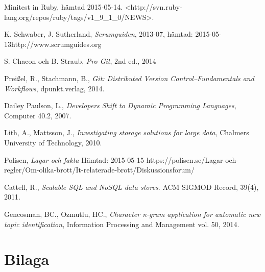 \documentclass[a4paper,12pt,oneside,final]{extbook}
\begin{document}
\begin{thebibliography}{99}
  Minitest in Ruby, hämtad 2015-05-14.
  \newline<http://svn.ruby-lang.org/repos/ruby/tags/v1\_9\_1\_0/NEWS>.

  K. Schwaber, J. Sutherland, \emph{Scrumguiden}, 2013-07, hämtad: 2015-05-13\newline http://www.scrumguides.org

  S. Chacon och B. Straub, \emph{Pro Git}, 2nd ed., 2014

  Preißel, R., Stachmann, B., \emph{Git: Distributed Version Control--Fundamentals and Workflows}, dpunkt.verlag, 2014.

  Dailey Paulson, L., \emph{Developers Shift to Dynamic Programming Languages}, Computer 40.2, 2007.

  Lith, A., Mattsson, J., \emph{Investigating storage solutions for large data}, Chalmers University of Technology, 2010.

  Polisen, \emph{Lagar och fakta} Hämtad: 2015-05-15
  \newline https://polisen.se/Lagar-och-regler/Om-olika-brott/It-relaterade-brott/Diskussionsforum/

  Cattell, R., \emph{Scalable SQL and NoSQL data stores}. ACM SIGMOD Record, 39(4), 2011.

  Gencosman, BC., Ozmutlu, HC., \emph{Character n-gram application for automatic new topic identification},
  Information Processing and Management vol. 50, 2014.

\end{thebibliography}


\appendix

\chapter{Bilaga}
\end{document}
